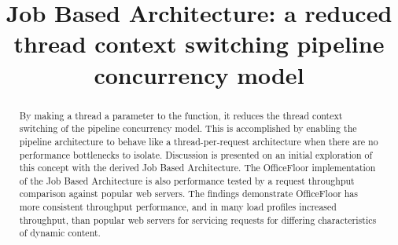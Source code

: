 \documentclass[conference]{ieee/IEEEtran}
\begin{document}
\title{Job Based Architecture: a reduced thread context switching pipeline
concurrency model}


\author{
}


% 








\maketitle


\begin{abstract}
By making a thread a parameter to the function, it reduces the thread context
switching of the pipeline concurrency model.  This is accomplished by enabling
the pipeline architecture to behave like a thread-per-request architecture when
there are no performance bottlenecks to isolate.  Discussion is presented on an
initial exploration of this concept with the derived Job Based Architecture. 
The OfficeFloor implementation of the Job Based Architecture is also performance
tested by a request throughput comparison against popular web servers.  The
findings demonstrate OfficeFloor has more consistent throughput performance,
and in many load profiles increased throughput, than popular web servers for
servicing requests for differing characteristics of dynamic content.
\end{abstract}
\end{document}
